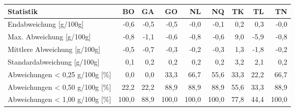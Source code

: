 \begin{tabular}{lrrrrrrrr}
\toprule
                     Statistik &    BO &   GA &    GO &    NL &    NQ &   TK &   TL &    TN \\
\midrule
        Endabweichung [g/100g] &  -0,6 & -0,5 &  -0,5 &  -0,0 &  -0,1 &  0,2 &  0,3 &  -0,0 \\
      Max. Abweichung [g/100g] &  -0,8 & -1,1 &  -0,6 &  -0,8 &  -0,6 &  9,0 & -5,9 &  -0,8 \\
  Mittlere Abweichung [g/100g] &  -0,5 & -0,7 &  -0,3 &  -0,2 &  -0,3 &  1,3 & -1,8 &  -0,2 \\
  Standardabweichung [g/100g]  &   0,1 &  0,2 &   0,2 &   0,2 &   0,2 &  3,2 &  2,1 &   0,2 \\
Abweichungen < 0,25 g/100g [\%] &   0,0 &  0,0 &  33,3 &  66,7 &  55,6 & 33,3 & 22,2 &  66,7 \\
Abweichungen < 0,50 g/100g [\%] &  22,2 & 22,2 &  88,9 &  88,9 &  88,9 & 55,6 & 33,3 &  88,9 \\
Abweichungen < 1,00 g/100g [\%] & 100,0 & 88,9 & 100,0 & 100,0 & 100,0 & 77,8 & 44,4 & 100,0 \\
\bottomrule
\end{tabular}
